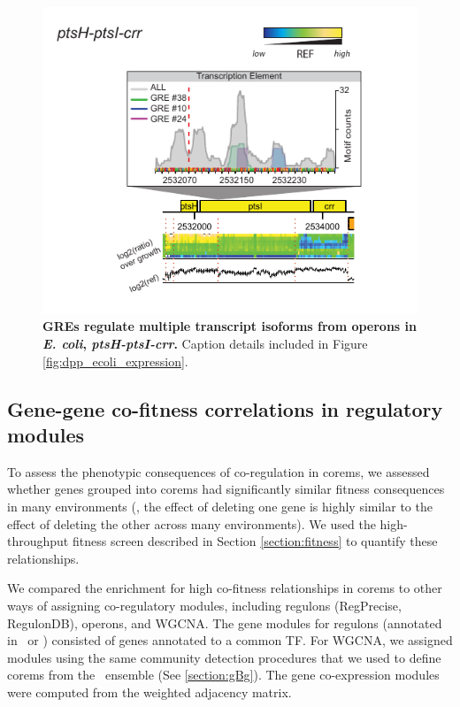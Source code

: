 \begin{figure}[hp]
\centering
\includegraphics[width=0.8\linewidth]{figures/ptsh.pdf}
\caption[GREs regulate multiple transcript isoforms from operons in
  {\it E. coli}, \textit{ptsH-ptsI-crr}]{\textbf{GREs regulate
    multiple transcript isoforms from operons in {\it E. coli},
    \textit{ptsH-ptsI-crr}.} Caption details included in Figure
  \ref{fig:dpp_ecoli_expression}.}
\label{fig:ptsh}
\end{figure}

\subsection{Gene-gene co-fitness correlations in regulatory modules}

To assess the phenotypic consequences of co-regulation in corems, we
assessed whether genes grouped into corems had significantly similar
fitness consequences in many environments (\ie, the effect of deleting
one gene is highly similar to the effect of deleting the other across
many environments). We used the high-throughput fitness screen
described in Section \ref{section:fitness} to quantify these
relationships.

We compared the enrichment for high co-fitness relationships in corems
to other ways of assigning co-regulatory modules, including regulons
(RegPrecise, RegulonDB), operons, and WGCNA. The gene modules for
regulons (annotated in \rdb~or 
\cite{Novichkov2013}) consisted of genes annotated to a common TF. For
WGCNA, we assigned modules using the same community detection
procedures that we used to define corems from the \egrine~ensemble
(See \ref{section:gBg}). The gene co-expression modules were computed
from the weighted  adjacency matrix.

